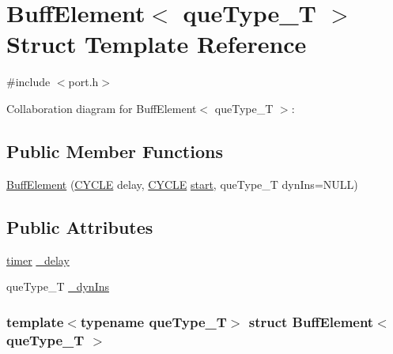 \hypertarget{structBuffElement}{
\section{BuffElement$<$ queType\_\-T $>$ Struct Template Reference}
\label{structBuffElement}
}


{\ttfamily \#include $<$port.h$>$}



Collaboration diagram for BuffElement$<$ queType\_\-T $>$:
\subsection*{Public Member Functions}
\begin{DoxyCompactItemize}
\item 
\hyperlink{structBuffElement_a69788db742784c5a833f179407a53f27}{BuffElement} (\hyperlink{global_2global_8h_a7e19a550ec11d1ed921deb20c22efb5b}{CYCLE} delay, \hyperlink{global_2global_8h_a7e19a550ec11d1ed921deb20c22efb5b}{CYCLE} \hyperlink{bkEnd_8cpp_ada310e7f72b38fadd4b24d80ed3438ee}{start}, queType\_\-T dynIns=NULL)
\end{DoxyCompactItemize}
\subsection*{Public Attributes}
\begin{DoxyCompactItemize}
\item 
\hyperlink{structtimer}{timer} \hyperlink{structBuffElement_ada387ae6cbadda86ba737303ee0efb65}{\_\-delay}
\item 
queType\_\-T \hyperlink{structBuffElement_aa61484d95939f5b8f0bdc06321b0fbcf}{\_\-dynIns}
\end{DoxyCompactItemize}
\subsubsection*{template$<$typename queType\_\-T$>$ struct BuffElement$<$ queType\_\-T $>$}



